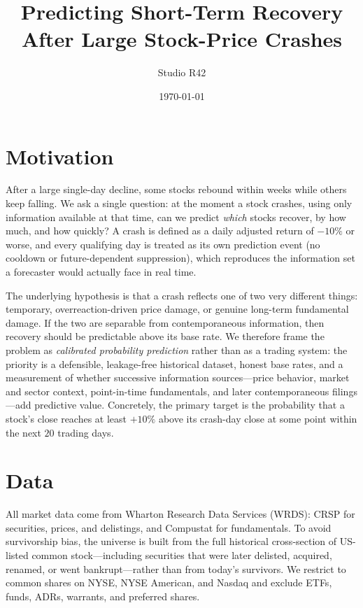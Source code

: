 \documentclass[11pt]{article}
\title{Predicting Short-Term Recovery After Large Stock-Price Crashes}
\author{Studio R42}
\date{\today}
\begin{document}
\maketitle

\section{Motivation}

After a large single-day decline, some stocks rebound within weeks while others
keep falling. We ask a single question: at the moment a stock crashes, using only
information available at that time, can we predict \emph{which} stocks recover, by
how much, and how quickly? A crash is defined as a daily adjusted return of
$-10\%$ or worse, and every qualifying day is treated as its own prediction event
(no cooldown or future-dependent suppression), which reproduces the information set
a forecaster would actually face in real time.

The underlying hypothesis is that a crash reflects one of two very different things:
temporary, overreaction-driven price damage, or genuine long-term fundamental
damage. If the two are separable from contemporaneous information, then recovery
should be predictable above its base rate. We therefore frame the problem as
\emph{calibrated probability prediction} rather than as a trading system: the
priority is a defensible, leakage-free historical dataset, honest base rates, and a
measurement of whether successive information sources---price behavior, market and
sector context, point-in-time fundamentals, and later contemporaneous
filings---add predictive value. Concretely, the primary target is the probability
that a stock's close reaches at least $+10\%$ above its crash-day close at some
point within the next $20$ trading days.

\section{Data}

All market data come from Wharton Research Data Services (WRDS): CRSP for
securities, prices, and delistings, and Compustat for fundamentals. To avoid
survivorship bias, the universe is built from the full historical cross-section of
US-listed common stock---including securities that were later delisted, acquired,
renamed, or went bankrupt---rather than from today's survivors. We restrict to
common shares on NYSE, NYSE American, and Nasdaq and exclude ETFs, funds, ADRs,
warrants, and preferred shares.
\end{document}
